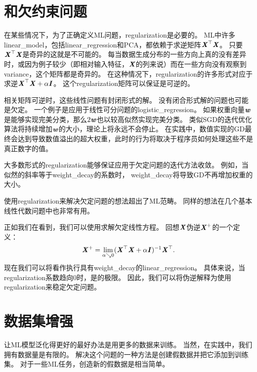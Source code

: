 \section{和欠约束问题}
\label{sec:regularization_and_under_constrained_problems}
在某些情况下，为了正确定义\gls{ML}问题，\gls{regularization}是必要的。
\gls{ML}中许多\gls{linear_model}，包括\gls{linear_regression}和PCA，都依赖于求逆矩阵$\boldsymbol{\mathit{X}}^\top\boldsymbol{\mathit{X}}$。
只要$\boldsymbol{\mathit{X}}^\top\boldsymbol{\mathit{X}}$是奇异的这就是不可能的。
每当数据生成分布的一些方向上真的没有差异时，或因为例子较少（即相对输入特征，$\boldsymbol{\mathit{X}}$的列来说）而在一些方向没有观察到\gls{variance}，这个矩阵都是奇异的。
在这种情况下，\gls{regularization}的许多形式对应于求逆$\boldsymbol{\mathit{X}}^\top\boldsymbol{\mathit{X}} + \alpha \boldsymbol{\mathit{I}}$。
这个\gls{regularization}矩阵可以保证是可逆的。

相关矩阵可逆时，这些线性问题有封闭形式的解。
没有闭合形式解的问题也可能是欠定。
一个例子是应用于线性可分问题的\gls{logistic_regression}。
如果权重向量$\boldsymbol{\mathit{w}}$是能够实现完美分类，那么$2 \boldsymbol{\mathit{w}}$也以较高似然实现完美分类。
类似\gls{SGD}的迭代优化算法将持续增加$\boldsymbol{\mathit{w}}$的大小，理论上将永远不会停止。
在实践中，数值实现的\gls{GD}最终会达到导致数值溢出的超大权重，此时的行为将取决于程序员如何处理这些不是真正数字的值。

大多数形式的\gls{regularization}能够保证应用于欠定问题的迭代方法收敛。
例如，当似然的斜率等于\gls{weight_decay}的系数时， \gls{weight_decay}将导致\gls{GD}不再增加权重的大小。

使用\gls{regularization}来解决欠定问题的想法超出了\gls{ML}范畴。
同样的想法在几个基本线性代数问题中也非常有用。


正如我们在看到，我们可以使用求解欠定线性方程。 
回想$\boldsymbol{\mathit{X}}$伪逆$\boldsymbol{\mathit{X}}^+$的一个定义：
\begin{align} 
\label{eq:729pseudo}
 \boldsymbol{\mathit{X}}^+ = \lim_{\alpha \searrow 0} (\boldsymbol{\mathit{X}}^\top \boldsymbol{\mathit{X}} + \alpha \boldsymbol{\mathit{I}})^{-1}\boldsymbol{\mathit{X}}^\top.
\end{align}
现在我们可以将看作执行具有\gls{weight_decay}的\gls{linear_regression}。
具体来说，当\gls{regularization}系数趋向0时，是的极限。
因此，我们可以将伪逆解释为使用\gls{regularization}来稳定欠定问题。


\section{数据集增强}
\label{sec:dataset_augmentation_chap7}
让\gls{ML}模型泛化得更好的最好办法是用更多的数据来训练。
当然，在实践中，我们拥有数据量是有限的。
解决这个问题的一种方法是创建假数据并把它添加到训练集。
对于一些\gls{ML}任务，创造新的假数据是相当简单。


